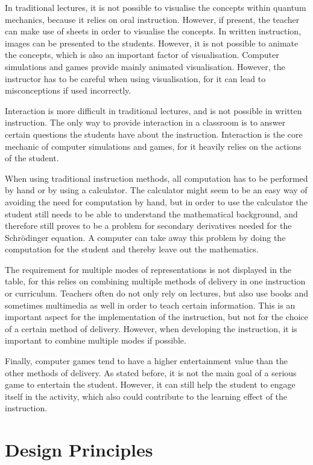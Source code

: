 \documentclass[11pt,twoside]{report} %
\begin{document}
In traditional lectures, it is not possible to visualise the concepts within quantum mechanics, because it relies on oral instruction. However, if present, the teacher can make use of sheets in order to visualise the concepts. In written instruction, images can be presented to the students. However, it is not possible to animate the concepts, which is also an important factor of visualisation. Computer simulations and games provide mainly animated visualisation. However, the instructor has to be careful when using visualisation, for it can lead to misconceptions if used incorrectly.

Interaction is more difficult in traditional lectures, and is not possible in written instruction. The only way to provide interaction in a classroom is to answer certain questions the students have about the instruction. Interaction is the core mechanic of computer simulations and games, for it heavily relies on the actions of the student.

When using traditional instruction methods, all computation has to be performed by hand or by using a calculator. The calculator might seem to be an easy way of avoiding the need for computation by hand, but in order to use the calculator the student still needs to be able to understand the mathematical background, and therefore still proves to be a problem for secondary derivatives needed for the Schrödinger equation. A computer can take away this problem by doing the computation for the student and thereby leave out the mathematics.

The requirement for multiple modes of representations is not displayed in the table, for this relies on combining multiple methods of delivery in one instruction or curriculum. Teachers often do not only rely on lectures, but also use books and sometimes multimedia as well in order to teach certain information. This is an important aspect for the implementation of the instruction, but not for the choice of a certain method of delivery. However, when developing the instruction, it is important to combine multiple modes if possible.

Finally, computer games tend to have a higher entertainment value than the other methods of delivery. As stated before, it is not the main goal of a serious game to entertain the student. However, it can still help the student to engage itself in the activity, which also could contribute to the learning effect of the instruction.

\chapter{Design Principles}
\label{ch:designprinciples}
\end{document}
